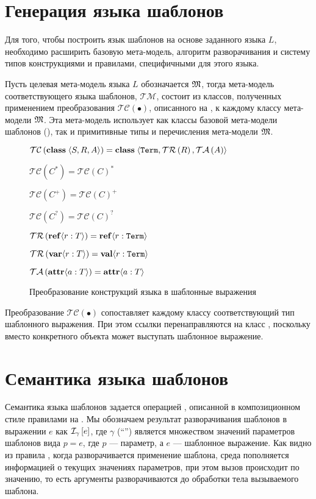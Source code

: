 \section{Генерация языка шаблонов}

\newcommand{\TM}{\mathcal{TM}}
\newcommand{\TC}[1]{\mathcal{TC}\left(#1\right)}
\newcommand{\TR}[1]{\mathcal{TR}\left(#1\right)}
\newcommand{\TA}[1]{\mathcal{TA}\left(#1\right)}

Для того, чтобы построить язык шаблонов на основе заданного языка $L$, необходимо расширить базовую мета-модель, алгоритм разворачивания и систему типов конструкциями и правилами, специфичными для этого языка. 

Пусть целевая мета-модель языка $L$ обозначается $\mathfrak{M}$, тогда мета-модель соответствующего языка шаблонов, $\TM$, состоит из классов, полученных применением преобразования $\TC{\bullet}$, описанного на , к каждому классу мета-модели $\mathfrak{M}$. Эта мета-модель использует как классы базовой мета-модели шаблонов (), так и примитивные типы и перечисления мета-модели $\mathfrak{M}$.

\begin{figure}[htbp]
	\centering
$\TC{\class{}{S}{R}{A}} = \class{}
			{\mathtt{Term}}{\TR{R}}{\TA{A}}$
			
$\TC{C^*} = \TC{C}^*$

$\TC{C^+} = \TC{C}^+$

$\TC{C^?} = \TC{C}^?$

$\TR{\reference{ref}{r}{T}} = \reference{ref}{r}{\mathtt{Term}}$

$\TR{\reference{var}{r}{T}} = \reference{val}{r}{\mathtt{Term}}$

$\TA{\attribute{a}{T}} = \attribute{a}{T}$
	\caption{Преобразование конструкций языка в шаблонные выражения}\label{TC}
\end{figure}

Преобразование $\TC{\bullet}$ сопоставляет каждому классу соответствующий тип шаблонного выражения. При этом ссылки перенаправляются на класс , поскольку вместо конкретного объекта может выступать шаблонное выражение.

\section{Семантика языка шаблонов}

Семантика языка шаблонов задается операцией , описанной в композиционном стиле правилами на . Мы обозначаем результат разворачивания шаблонов в выражении $e$ как $\mathcal{I}_{\gamma} \left[ e \right]$, где $\gamma$ (``'') является множеством значений параметров шаблонов вида $p = e$, где $p$ --- параметр, а $e$ --- шаблонное выражение. Как видно из правила , когда разворачивается применение шаблона, среда пополняется информацией о текущих значениях параметров, при этом вызов происходит по значению, то есть аргументы разворачиваются до обработки тела вызываемого шаблона. 

